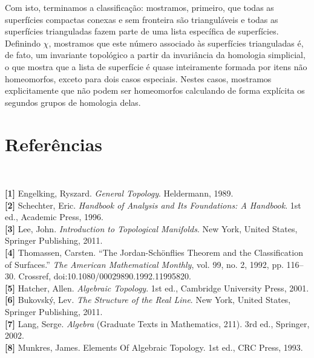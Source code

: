 \documentclass[12pt,a4paper]{article}
\theoremstyle{definition}
\begin{document}
Com isto, terminamos a classificação: mostramos, primeiro, que todas as superfícies compactas conexas e sem fronteira são trianguláveis e todas as superfícies trianguladas fazem parte de uma lista específica de superfícies. Definindo $\chi$, mostramos que este número associado às superfícies trianguladas é, de fato, um invariante topológico a partir da invariância da homologia simplicial, o que mostra que a lista de superfície é quase inteiramente formada por itens não homeomorfos, exceto para dois casos especiais. Nestes casos, mostramos explicitamente que não podem ser homeomorfos calculando de forma explícita os segundos grupos de homologia delas.

\section{Referências}

\ 

\textbf{[1]} Engelking, Ryszard. \textit{General Topology}. Heldermann, 1989. \\ 

\textbf{[2]} Schechter, Eric. \textit{Handbook of Analysis and Its Foundations: A Handbook}. 1st ed., Academic Press, 1996. \\ 

\textbf{[3]} Lee, John. \textit{Introduction to Topological Manifolds}. New York, United States, Springer Publishing, 2011. \\ 

\textbf{[4]} Thomassen, Carsten. “The Jordan-Schönflies Theorem and the Classification of Surfaces.” \textit{The American Mathematical Monthly}, vol. 99, no. 2, 1992, pp. 116–30. Crossref, doi:10.1080/00029890.1992.11995820. \\ 

\textbf{[5]} Hatcher, Allen. \textit{Algebraic Topology}. 1st ed., Cambridge University Press, 2001. \\ 

\textbf{[6]} Bukovský, Lev.  \textit{The Structure of the Real Line}. New York, United States, Springer Publishing, 2011. \\ 

\textbf{[7]} Lang, Serge. \textit{Algebra} (Graduate Texts in Mathematics, 211). 3rd ed., Springer, 2002. \\ 

\textbf{[8]} Munkres, James. Elements Of Algebraic Topology. 1st ed., CRC Press, 1993. \\ 
\end{document}
